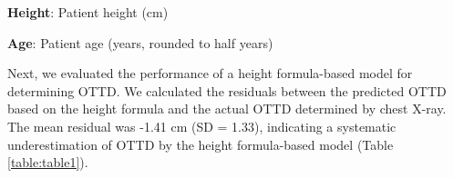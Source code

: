 \documentclass[11pt]{article}
\begin{document}
\begin{table}[h]
\caption{Descriptive statistics of height and age stratified by sex.}
\label{table:table0}
\begin{threeparttable}
\renewcommand{\TPTminimum}{\linewidth}
\begin{tablenotes}
\footnotesize
\item \textbf{Height}: Patient height (cm)
\item \textbf{Age}: Patient age (years, rounded to half years)
\end{tablenotes}
\end{threeparttable}
\end{table}


Next, we evaluated the performance of a height formula-based model for determining OTTD. We calculated the residuals between the predicted OTTD based on the height formula and the actual OTTD determined by chest X-ray. The mean residual was -1.41 cm (SD = 1.33), indicating a systematic underestimation of OTTD by the height formula-based model (Table {}\ref{table:table1}).

\begin{table}[h]
\caption{Descriptive statistics of Height Formula-based Model residuals.}
\label{table:table1}
\begin{threeparttable}
\renewcommand{\TPTminimum}{\linewidth}
\begin{tablenotes}
\footnotesize
\item 
\end{tablenotes}
\end{threeparttable}
\end{table}
\end{document}
